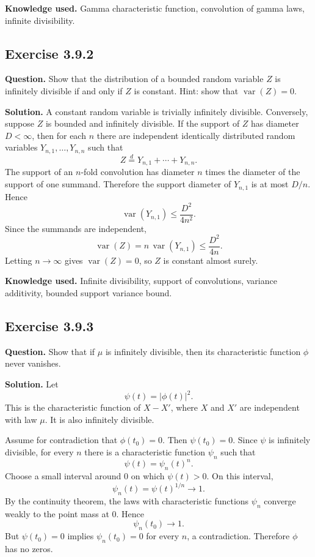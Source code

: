 \documentclass[11pt]{article}
\begin{document}
\textbf{Knowledge used.}
Gamma characteristic function, convolution of gamma laws, infinite
divisibility.

\subsection*{Exercise 3.9.2}
\textbf{Question.}
Show that the distribution of a bounded random variable $Z$ is
infinitely divisible if and only if $Z$ is constant.  Hint: show that
$\operatorname{var}(Z)=0$.

\textbf{Solution.}
A constant random variable is trivially infinitely divisible.  Conversely,
suppose $Z$ is bounded and infinitely divisible.  If the support of $Z$
has diameter $D<\infty$, then for each $n$ there are independent
identically distributed random variables $Y_{n,1},\ldots,Y_{n,n}$ such
that
\[
  Z\stackrel{d}{=}Y_{n,1}+\cdots+Y_{n,n}.
\]
The support of an $n$-fold convolution has diameter $n$ times the
diameter of the support of one summand.  Therefore the support diameter
of $Y_{n,1}$ is at most $D/n$.  Hence
\[
  \operatorname{var}(Y_{n,1})\le \frac{D^2}{4n^2}.
\]
Since the summands are independent,
\[
  \operatorname{var}(Z)
  =
  n\,\operatorname{var}(Y_{n,1})
  \le
  \frac{D^2}{4n}.
\]
Letting $n\to\infty$ gives $\operatorname{var}(Z)=0$, so $Z$ is constant
almost surely.

\textbf{Knowledge used.}
Infinite divisibility, support of convolutions, variance additivity,
bounded support variance bound.

\subsection*{Exercise 3.9.3}
\textbf{Question.}
Show that if $\mu$ is infinitely divisible, then its characteristic
function $\phi$ never vanishes.

\textbf{Solution.}
Let
\[
  \psi(t)=|\phi(t)|^2.
\]
This is the characteristic function of $X-X'$, where $X$ and $X'$ are
independent with law $\mu$.  It is also infinitely divisible.

Assume for contradiction that $\phi(t_0)=0$.  Then $\psi(t_0)=0$.  Since
$\psi$ is infinitely divisible, for every $n$ there is a characteristic
function $\psi_n$ such that
\[
  \psi(t)=\psi_n(t)^n.
\]
Choose a small interval around $0$ on which $\psi(t)>0$.  On this
interval,
\[
  \psi_n(t)=\psi(t)^{1/n}\to1.
\]
By the continuity theorem, the laws with characteristic functions
$\psi_n$ converge weakly to the point mass at $0$.  Hence
\[
  \psi_n(t_0)\to1.
\]
But $\psi(t_0)=0$ implies $\psi_n(t_0)=0$ for every $n$, a contradiction.
Therefore $\phi$ has no zeros.
\end{document}
